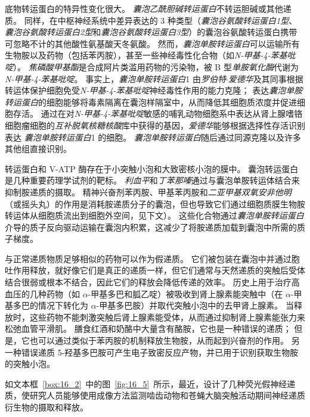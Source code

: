 底物转运蛋白的特异性变化很大。
\textit{囊泡乙酰胆碱转运蛋白}不转运胆碱或其他递质。
同样，在中枢神经系统中差异表达的 3 种类型（\textit{囊泡谷氨酸转运蛋白1型}、\textit{囊泡谷氨酸转运蛋白2型}和\textit{囊泡谷氨酸转运蛋白3型}）的囊泡谷氨酸转运蛋白携带可忽略不计的其他酸性氨基酸天冬氨酸。
然而，\textit{囊泡单胺转运蛋白}可以运输所有生物胺以及药物（包括苯丙胺），甚至一些神经毒性化合物（如\textit{N-甲基-4-苯基吡啶}）。
\textit{焦磷酸甲基酯}是合成阿片类滥用药物的污染物，被 B 型\textit{单胺氧化酶}代谢为\textit{N-甲基-4-苯基吡啶}。
事实上，\textit{囊泡单胺转运蛋白}1 由\textit{罗伯特$\cdot$爱德华}及其同事根据转运体保护细胞免受\textit{N-甲基-4-苯基吡啶}神经毒性作用的能力克隆；
表达\textit{囊泡单胺转运蛋白}的细胞能够将毒素隔离在囊泡样隔室中，从而降低其细胞质浓度并促进细胞存活。
通过在对\textit{N-甲基-4-苯基吡啶}敏感的哺乳动物细胞系中表达从肾上腺嗜铬细胞瘤细胞的\textit{互补脱氧核糖核酸}库中获得的基因，\textit{爱德华}能够根据选择性存活识别表达 \textit{囊泡单胺转运蛋白}1 的细胞。
\textit{囊泡单胺转运蛋白}随后通过同源克隆以及许多其他组直接识别。


转运蛋白和 V-ATP 酶存在于小突触小泡和大致密核小泡的膜中。
囊泡转运蛋白是几种重要药理学试剂的靶标。
\textit{利血平}和\textit{丁苯那嗪}通过与囊泡单胺转运体结合来抑制胺递质的摄取。
精神兴奋剂苯丙胺、甲基苯丙胺和\textit{二亚甲基双氧安非他明}（或摇头丸）的作用是消耗胺递质分子的囊泡，但也导致它们通过细胞质膜生物胺转运体从细胞质流出到细胞外空间，见下文）。
这些化合物通过\textit{囊泡单胺转运蛋白} 介导的质子反向驱动运输在囊泡内积累，这减少了将胺递质加载到囊泡中所需的质子梯度。


与正常递质物质足够相似的药物可以作为假递质。
它们被包装在囊泡中并通过胞吐作用释放，就好像它们是真正的递质一样，但它们通常与天然递质的突触后受体结合很弱或根本不结合，因此它们的释放会降低传递的效率。
历史上用于治疗高血压的几种药物（如 $\alpha$-甲基多巴和胍乙啶）被吸收到肾上腺素能突触中（在 $\alpha$-甲基多巴的情况下转化为 $\alpha$-甲基多巴胺）并取代突触小泡中的去甲肾上腺素。
当释放时，这些药物不能刺激突触后肾上腺素能受体，从而通过抑制肾上腺素能张力来松弛血管平滑肌。
膳食红酒和奶酪中大量含有酪胺，它也是一种错误的递质；
但是，它也可以通过类似于苯丙胺的机制释放生物胺，从而起到兴奋剂的作用。
另一种错误递质 5-羟基多巴胺可产生电子致密反应产物，并已用于识别获取生物胺的突触小泡。


如文本框~\ref{box:16_2}~中的图~\ref{fig:16_5}~所示，最近，设计了几种荧光假神经递质，使研究人员能够使用成像方法监测啮齿动物和苍蝇大脑突触活动期间神经递质衍生物的摄取和释放。


